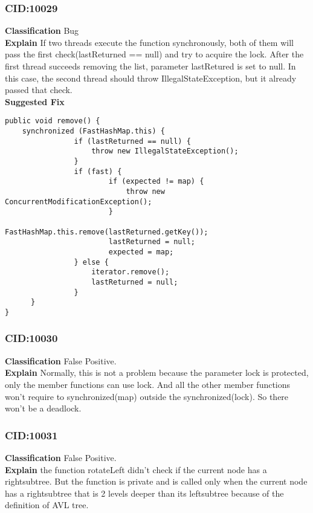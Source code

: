 \documentclass[10pt]{article}
\begin{document}
\subsubsection{CID:10029}
\textbf{Classification}
Bug
\\\textbf{Explain}
If two threads execute the function synchronously, both of them will pass the first check(lastReturned == null) and try to acquire the lock. After the first thread succeeds removing the list, parameter lastRetured is set to null. In this case, the second thread should throw IllegalStateException, but it already passed that check.
\\\textbf{Suggested Fix}
\begin{verbatim}
public void remove() {
 	synchronized (FastHashMap.this) {
                if (lastReturned == null) {
                    throw new IllegalStateException();
                }
                if (fast) {
                        if (expected != map) {
                            throw new ConcurrentModificationException();
                        }
                        FastHashMap.this.remove(lastReturned.getKey());
                        lastReturned = null;
                        expected = map;
                } else {
                    iterator.remove();
                    lastReturned = null;
                }
      }
}
\end{verbatim}



\subsubsection{CID:10030}
\textbf{Classification}
False Positive.
\\\textbf{Explain} 
Normally, this is not a problem because the parameter lock is protected, only the member functions can use lock. And all the other member functions won't require to synchronized(map) outside the synchronized(lock). So there won't be a deadlock.

\subsubsection{CID:10031}
\textbf{Classification}
False Positive.
\\\textbf{Explain} 
the function rotateLeft didn't check if the current node has a rightsubtree. But the function is private and is called only when the current node has a rightsubtree that is 2 levels deeper than its leftsubtree because of the definition of AVL tree.
\end{document}
